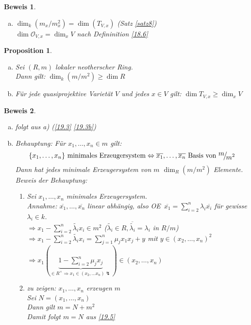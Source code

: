 \documentclass[a4paper,12pt]{report}
\theoremstyle{break}
\newtheorem{Prop}[Def]{Proposition}
\theoremstyle{nonumberbreak}
\newtheorem{Bew}{Beweis}
\theoremstyle{nonumberplain}
\newcommand{\quot}[1]{\textrm{\glqq}{#1}\textrm{\grqq}}
\newcommand{\Sum}{\sum\limits}
\newenvironment{twosidedproof}{\begin{enumerate}[\quot{$\Rightarrow$}:]}{\end{enumerate}}
\newcommand{\proofforward}{\item[\quot{$\Rightarrow$}:]}
\newcommand{\proofreverse}{\item[\quot{$\Leftarrow$}:]}
\newcommand{\calO}{\mathcal{O}}
\newcommand{\FakRaum}[2]{
  \raisebox{0.7ex}{\ensuremath{#1}}
  \ensuremath{\mkern-3mu}\big/\ensuremath{\mkern-3mu}
  \raisebox{-0.6ex}{\ensuremath{#2}}}
\renewcommand{\OE}{O\!\!E~}
\begin{document}
\begin{Bew}\begin{enumerate}[a)]
\item[b)]
	$\dim_k(m_x/m_x^2)=\dim(T_{V,x})$ (Satz \ref{satz8})\\
	$\dim \calO_{V,x}=\dim_x V$ nach Defininition \ref{18.6}
\end{enumerate}\end{Bew}

\begin{Prop}\label{19.4}\begin{enumerate}[a)]
\item
	Sei $(R,m)$ lokaler neotherscher Ring.\\
	Dann gilt: $\dim_k(m/m^2)\ge\dim R$
\item
	F\"ur jede quasiprojektive Variet\"at $V$ und jedes $x\in V$ gilt: $\dim T_{V,x}\ge\dim_xV$
\end{enumerate}\end{Prop}

\begin{Bew}\begin{enumerate}[a)]
\item[b)]
	folgt aus a) (\ref{19.3} \ref{19.3b})
\item[a)]
	\emph{Behauptung:} F\"ur $x_1,\ldots ,x_n\in m$ gilt:
		\[\{x_1,\ldots ,x_n\} \text{ minimales Erzeugersystem} \Leftrightarrow \overline{x_1},\ldots ,\overline{x_n} \text{ Basis von } \FakRaum{m}{m^2}\]
	Dann hat jedes minimale Erzeugersystem von $m$ $\dim_R(m/m^2)$ Elemente.\\
	\emph{Beweis der Behauptung:}\begin{twosidedproof}
	\proofforward
		Sei $x_1,\ldots ,x_n$ minimales Erzeugersystem.\\
		\emph{Annahme:} $\overline{x_1},\ldots ,\overline{x_n}$ linear abh\"angig, also \OE $\overline{x_1}=\Sum_{i=2}^n\lambda_i\overline{x_i}$ f\"ur gewisse $\lambda_i\in k$.\\
		$\Rightarrow x_1-\Sum_{i=2}^n\tilde{\lambda_i}x_i\in m^2$ ($\tilde{\lambda_i}\in R, \overline{\tilde{\lambda_i}}=\lambda_i$ in $R/m$)\\
		$\Rightarrow x_1-\Sum_{i=2}^n\tilde{\lambda_i}x_i = \Sum_{j=1}^n\mu_jx_1x_j+y$ mit $y\in(x_2,\ldots ,x_n)^2$\\
		$\Rightarrow x_1(\underbrace{1-\Sum_{i=2}^n\mu_jx_j}_{\in R^\times \Rightarrow x_1 \in (x_2,\ldots x_n) \lightning})\in (x_2,\ldots ,x_n)$
	\proofreverse
		\emph{zu zeigen:} $x_1,\ldots ,x_n$ erzeugen $m$\\
		Sei $N=(x_1,\ldots ,x_n)$\\
		Dann gilt $m=N+m^2$\\
		Damit folgt $m=N$ aus \ref{19.5}
	\end{twosidedproof}
\end{enumerate}\end{Bew}
\end{document}
